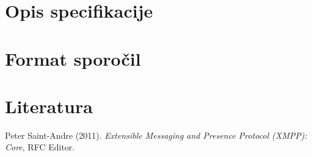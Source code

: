 \documentclass[11pt]{article}
\begin{document}
\section{Opis specifikacije}
\label{sec:orgc1fc41e}

\section{Format sporočil}
\label{sec:org7fb2390}

\section{Literatura}
\label{sec:org1960d83}

\noindent
Peter Saint-Andre (2011). \emph{{Extensible Messaging and Presence Protocol (XMPP): Core}}, RFC Editor.
\end{document}
